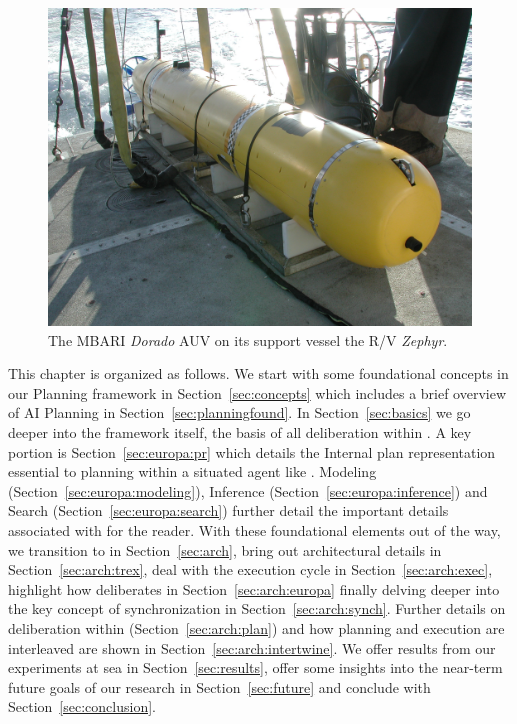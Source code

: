 \begin{figure}[t]
  \centering \vskip-5pt
  \includegraphics[scale=0.1]{figs/MBARI-AUV.jpg}
  \caption{\small The MBARI \emph{Dorado} AUV on its support vessel
    the R/V \emph{Zephyr}.}
  \label{fig:auv-fig}
  \vskip-0.3cm
\end{figure}

This chapter is organized as follows. We start with some foundational
concepts in our Planning framework in Section~\ref{sec:concepts} which
includes a brief overview of AI Planning in
Section~\ref{sec:planningfound}. In Section~\ref{sec:basics} we go
deeper into the \eu framework itself, the basis of all deliberation
within \rx. A key portion is Section~\ref{sec:europa:pr} which details
the Internal plan representation essential to planning within a
situated agent like \rx. Modeling (Section~\ref{sec:europa:modeling}),
Inference (Section~\ref{sec:europa:inference}) and Search
(Section~\ref{sec:europa:search}) further detail the important details
associated with \eu for the reader. With these foundational elements
out of the way, we transition to \rx in Section~\ref{sec:arch}, bring
out architectural details in Section~\ref{sec:arch:trex}, deal with
the execution cycle in Section~\ref{sec:arch:exec}, highlight how \rx
deliberates in Section~\ref{sec:arch:europa} finally delving deeper
into the key concept of synchronization in
Section~\ref{sec:arch:synch}. Further details on deliberation within
\rx (Section~\ref{sec:arch:plan}) and how planning and execution are
interleaved are shown in Section~\ref{sec:arch:intertwine}. We offer
results from our experiments at sea in Section~\ref{sec:results},
offer some insights into the near-term future goals of our research in
Section~\ref{sec:future} and conclude with
Section~\ref{sec:conclusion}.
